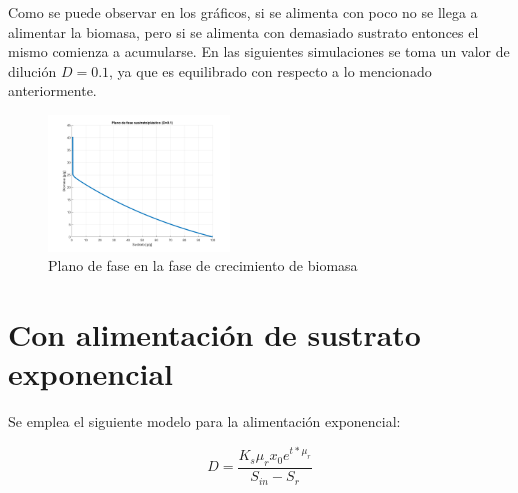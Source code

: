\documentclass[letterpaper, 10 pt, conference]{ieeeconf}  %
\begin{document}
Como se puede observar en los gráficos, si se alimenta con poco no se llega a alimentar la biomasa, pero si se alimenta con demasiado sustrato entonces el mismo comienza a acumularse. En las siguientes simulaciones se toma un valor de dilución $D=0.1$, ya que es equilibrado con respecto a lo mencionado anteriormente.

\begin{figure}[H]
  \centering
  \includegraphics[width=0.43\textwidth]{./Images_tp1/D1_plano_fase.png}
  \caption{Plano de fase en la fase de crecimiento de biomasa}
\end{figure}

\section{Con alimentación de sustrato exponencial}

Se emplea el siguiente modelo para la alimentación exponencial:

\begin{equation*}
D = \frac{K_{s}\mu_{r}x_{0}e^{t*\mu_{r}}}{S_{in}-S_{r}}
\end{equation*}
\end{document}
